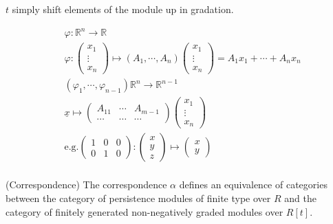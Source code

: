 \documentclass[11pt,a4paper]{report}
\begin{document}
              $t$ simply shift elements of the module up in gradation.

            \begin{Ex}

              \begin{align*}
                &\varphi: \mathbb{R}^n \rightarrow \mathbb{R}\\
                &\varphi: \begin{pmatrix}x_1\\\vdots\\x_n\end{pmatrix} \mapsto (A_1, \cdots, A_n)\begin{pmatrix}x_1\\\vdots\\x_n\end{pmatrix} = A_1x_1 + \cdots + A_nx_n\\
                &(\varphi_1, \cdots, \varphi_{n-1}) \mathbb{R}^n \rightarrow \mathbb{R}^{n-1}\\
                &\underline{x} \mapsto \begin{pmatrix}A_{11} & \cdots & A_{m-1}\\ \cdots&\cdots&\cdots\end{pmatrix}\begin{pmatrix}x_1\\\vdots\\x_n\end{pmatrix}\\
                &\textrm{e.g.} \begin{pmatrix}1&0&0\\0&1&0\end{pmatrix}:\begin{pmatrix}x\\y\\z\end{pmatrix} \mapsto \begin{pmatrix}x\\y\end{pmatrix}\\
              \end{align*}

            \end{Ex}


              \begin{thm} (Correspondence) The correspondence $\alpha$ defines an equivalence of categories between the category of persistence modules of finite type over $R$ and the category of finitely generated non-negatively graded modules over $R[t]$.
              \end{thm}
\end{document}
